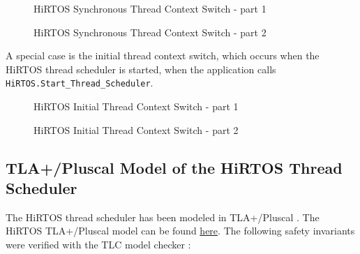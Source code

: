 \documentclass[11pt,letterpaper,twoside,openany]{book}
\begin{document}
\begin{figure}[H]
   \centering
   \scalebox{0.40} {
      
   }
   \caption{HiRTOS Synchronous Thread Context Switch - part 1}
   \label{HiRTOSumlSeqDiagram3}
\end{figure}

\begin{figure}[H]
   \centering
   \scalebox{0.40} {
      
   }
   \caption{HiRTOS Synchronous Thread Context Switch - part 2}
   \label{HiRTOSumlSeqDiagram4}
\end{figure}

A special case is the initial thread context switch, which occurs when the
HiRTOS thread scheduler is started, when the application calls
\verb`HiRTOS.Start_Thread_Scheduler`.

\begin{figure}[H]
   \centering
   \scalebox{0.40} {
      
   }
   \caption{HiRTOS Initial Thread Context Switch - part 1}
   \label{HiRTOSumlSeqDiagram5}
\end{figure}

\begin{figure}[H]
   \centering
   \scalebox{0.40} {
      
   }
   \caption{HiRTOS Initial Thread Context Switch - part 2}
   \label{HiRTOSumlSeqDiagram6}
\end{figure}

\subsection{TLA+/Pluscal Model of the HiRTOS Thread Scheduler}

The HiRTOS thread scheduler has been modeled in TLA+/Pluscal \cite{tla1, tla2}.
The HiRTOS TLA+/Pluscal model can be found \href{run:./tla_models/HiRTOS.pdf}{here}.
The following safety invariants were verified with the TLC model checker \cite{tlc}:
\end{document}
